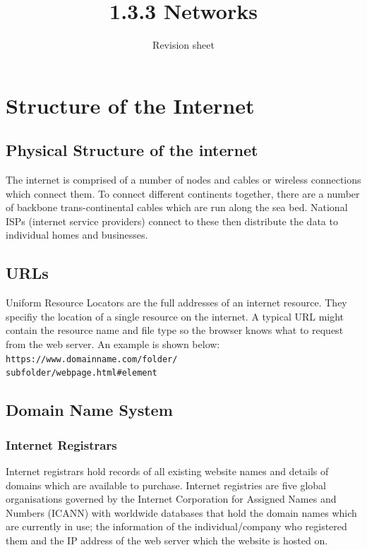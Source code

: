 \documentclass[a4paper,11pt, twocolumn]{article}
\title{1.3.3 Networks}
\author{Revision sheet}
\date{}
\begin{document}
\maketitle
\thispagestyle{fancy}


\section{Structure of the Internet}
\subsection{Physical Structure of the internet}
The internet is comprised of a number of nodes and cables or wireless connections which connect them. To connect different continents together, there are a number of backbone trans-continental cables which are run along the sea bed. National ISPs (internet service providers) connect to these then distribute the data to individual homes and businesses.
\subsection{URLs}
Uniform Resource Locators are the full addresses of an internet resource. They specifiy the location of a single resource on the internet. A typical URL might contain the resource name and file type so the browser knows what to request from the web server. An example is shown below:\\
\verb|https://www.domainname.com/folder/|\\ \verb|subfolder/webpage.html#element|

\subsection{Domain Name System}
\subsubsection{Internet Registrars}
Internet registrars hold records of all existing website names and details of domains which are available to purchase. Internet registries are five global organisations governed by the Internet Corporation for Assigned Names and Numbers (ICANN) with worldwide databases that hold the domain names which are currently in use; the information of the individual/company who registered them and the IP address of the web server which the website is hosted on. 
\end{document}
